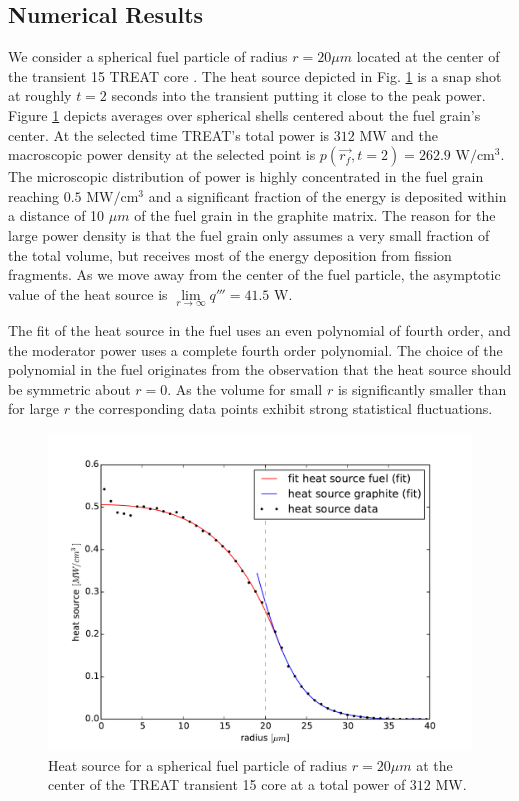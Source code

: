 \documentclass{anstrans}
\begin{document}
\subsection{Numerical Results}
We consider a spherical fuel particle of radius $r=20\mu m$ located at the center of the transient 15 TREAT core \cite{DeHart2016}. The heat source depicted in Fig. \ref{fig:heat_source} is a snap shot at roughly $t=2$ seconds into the transient putting it close to the peak power. Figure \ref{fig:heat_source} depicts averages over spherical shells centered about the fuel grain's center.  
At the selected time TREAT's total power is $312$ MW and the macroscopic power density at the selected point is $p(\vec{r_f}, t=2) = 262.9$ $\text{W}/ \text{cm}^3$. The microscopic distribution of power is highly concentrated in the fuel grain reaching $0.5$ $\text{MW}/ \text{cm}^3$ and a significant fraction of the energy is deposited within a distance of 10 $\mu m$ of the fuel grain in the graphite matrix. The reason for the large power density is that the fuel grain only assumes a very small fraction of the total volume, but receives most of the energy deposition from fission fragments. As we move away from the center of the fuel particle, the asymptotic value of the heat source is $\lim\limits_{r\rightarrow \infty} q''' = 41.5$ W.

The fit of the heat source in the fuel uses an even polynomial of fourth order, and the moderator power uses a complete fourth order polynomial. The choice of the polynomial in the fuel originates from the observation that the 
heat source should be symmetric about $r=0$. As the volume for small $r$ is significantly smaller than for large $r$ the corresponding data points exhibit strong statistical fluctuations. 

\begin{figure}[ht] %
 \centering
  \includegraphics[scale=0.45]{./figures/heat_source.pdf}
  \caption{Heat source for a spherical fuel particle of radius $r=20 \mu m$ at the center of the TREAT transient 15 core at a total power of $312$ MW. \label{fig:heat_source}}
\end{figure}
\end{document}
